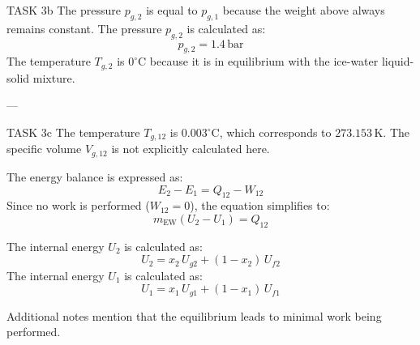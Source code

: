 TASK 3b  
The pressure \( p_{g,2} \) is equal to \( p_{g,1} \) because the weight above always remains constant.  
The pressure \( p_{g,2} \) is calculated as:  
\[
p_{g,2} = 1.4 \, \text{bar}
\]  
The temperature \( T_{g,2} \) is \( 0^\circ\text{C} \) because it is in equilibrium with the ice-water liquid-solid mixture.  

---

TASK 3c  
The temperature \( T_{g,12} \) is \( 0.003^\circ\text{C} \), which corresponds to \( 273.153 \, \text{K} \).  
The specific volume \( V_{g,12} \) is not explicitly calculated here.  

The energy balance is expressed as:  
\[
E_2 - E_1 = Q_{12} - W_{12}
\]  
Since no work is performed (\( W_{12} = 0 \)), the equation simplifies to:  
\[
m_{\text{EW}} (U_2 - U_1) = Q_{12}
\]  

The internal energy \( U_2 \) is calculated as:  
\[
U_2 = x_2 \, U_{g2} + (1 - x_2) \, U_{f2}
\]  
The internal energy \( U_1 \) is calculated as:  
\[
U_1 = x_1 \, U_{g1} + (1 - x_1) \, U_{f1}
\]  

Additional notes mention that the equilibrium leads to minimal work being performed.